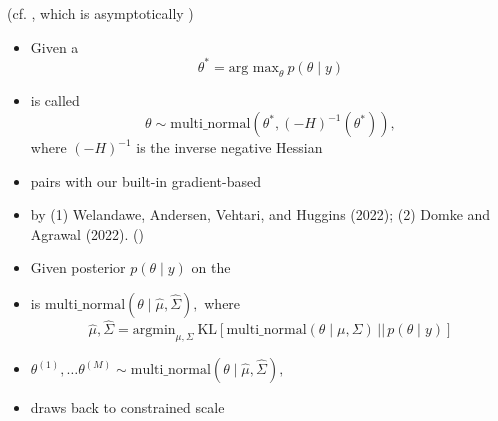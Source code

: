 \documentclass[9pt]{report}
\newcommand{\draw}[2]{#1^{(#2)}}
\begin{document}
\sld{}
\vfill 
\begin{center}
  {\Huge {}}
\end{center}
\vfill 
\vfill 
\begin{center}
{\Large  (cf. , which is asymptotically )}
\end{center}

\begin{itemize}
\item Given a 
  $$\theta^* = \textrm{arg max}_\theta \ p(\theta \mid y)$$
\item {} is called 
  $$\theta \sim \textrm{multi\_normal}(\theta^*, (-H)^{-1}(\theta^*)),$$
  where $(-H)^{-1}$ is the inverse negative Hessian
\item pairs with our built-in gradient-based 
  \vfill
\item {} by (1) Welandawe, Andersen, Vehtari, and
  Huggins (2022); (2) Domke and Agrawal (2022).  ()
\end{itemize}

\begin{itemize}
\item Given posterior $p(\theta \mid y)$ on the
\item {} is $\textrm{multi\_normal}\!\left(\theta \mid
  \widehat{\mu}, \widehat{\Sigma}\right),$ where
    $$
  \widehat{\mu}, \widehat{\Sigma}
  = \textrm{argmin}_{\mu, \Sigma}
  \ \textrm{KL}\!\left[\textrm{multi\_normal}(\theta \mid \mu, \Sigma) 
    \,\big|\big|\, p(\theta \mid y) \right]
  $$
\item {} $\draw{\theta}{1}, \ldots \draw{\theta}{M} \sim \textrm{multi\_normal}\!\left(\theta \mid
    \widehat{\mu}, \widehat{\Sigma}\right),$
\item {} draws back to constrained scale
\end{itemize}
\end{document}
